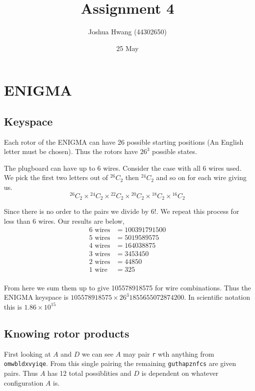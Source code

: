 \documentclass{article}
\title{Assignment 4}
\author{Joshua Hwang (44302650)}
\date{25 May}
\begin{document}
\maketitle

\section{ENIGMA}
\subsection{Keyspace}
Each rotor of the ENIGMA can have 26 possible starting positions
(An English letter must be chosen). Thus the rotors have $26^3$
possible states.

The plugboard can have up to 6 wires.
Consider the case with all 6 wires used. We pick the first two letters out of
${}^{26}C_2$ then ${}^{24}C_2$ and so on for each wire giving us.
\[
    {}^{26}C_2 \times {}^{24}C_2 \times {}^{22}C_2 \times {}^{20}C_2
        \times {}^{18}C_2 \times {}^{16}C_2
\]

Since there is no order to the pairs we divide by $6!$. We repeat this
process for less than 6 wires. Our results are below,
\begin{align*}
    \text{6 wires} &= 100391791500 \\
    \text{5 wires} &= 5019589575 \\
    \text{4 wires} &= 164038875 \\
    \text{3 wires} &= 3453450 \\
    \text{2 wires} &= 44850 \\
    \text{1 wire}  &= 325 \\
\end{align*}

From here we sum them up to give 105578918575 for wire combinations.
Thus the ENIGMA keyspace is $105578918575 \times 26^3 1855655072874200$.
In scientific notation this is $1.86 \times 10^15$

\subsection{Knowing rotor products}

First looking at $A$ and $D$ we can see $A$ may pair \texttt{r} wth anything
from \texttt{omwbldxvyiqe}. From this single pairing the remaining
\texttt{guthapznfcs} are given pairs. Thus $A$ has 12 total possiblities and
$D$ is dependent on whatever configuration $A$ is.
\end{document}
